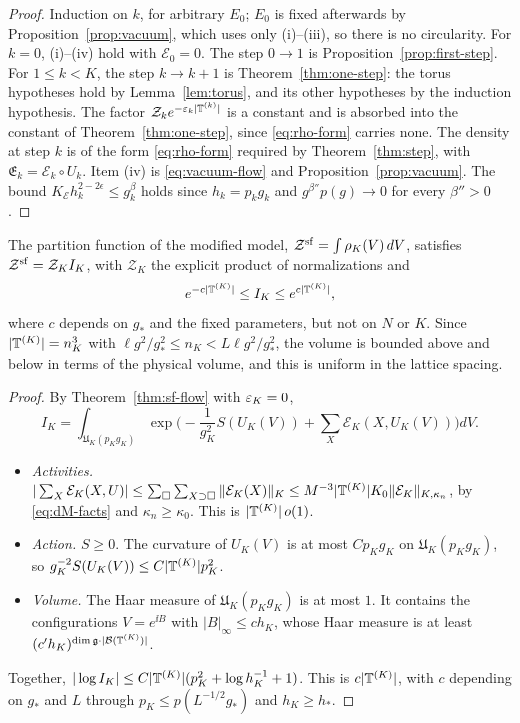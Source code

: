 \begin{proof}
Induction on $k$, for arbitrary $E_0$; $E_0$ is fixed afterwards by Proposition~\ref{prop:vacuum}, which uses only (i)--(iii), so there is no circularity. For $k=0$, (i)--(iv) hold with $\mathcal E_0=0$. The step $0\to1$ is Proposition~\ref{prop:first-step}. For $1\le k<K$, the step $k\to k+1$ is Theorem~\ref{thm:one-step}: the torus hypotheses hold by Lemma~\ref{lem:torus}, and its other hypotheses by the induction hypothesis. The factor $\mathcal Z_ke^{-\varepsilon_k|\mathbb T^{(k)}|}$ is a constant and is absorbed into the constant of Theorem~\ref{thm:one-step}, since \eqref{eq:rho-form} carries none. The density at step $k$ is of the form \eqref{eq:rho-form} required by Theorem~\ref{thm:step}, with $\mathfrak E_k=\mathcal E_k\circ U_k$. Item (iv) is \eqref{eq:vacuum-flow} and Proposition~\ref{prop:vacuum}. The bound $K_{\mathcal E}h_k^{2-2\epsilon}\le g_k^\beta$ holds since $h_k=p_kg_k$ and $g^{\beta''}p(g)\to0$ for every $\beta''>0$.
\end{proof}

\begin{corollary}\label{cor:sf-stability}
The partition function of the modified model, $\mathcal Z^{\rm sf}=\int\rho_K(V)\,dV$, satisfies $\mathcal Z^{\rm sf}=\mathcal Z_KI_K$, with $\mathcal Z_K$ the explicit product of normalizations and
\[
e^{-c|\mathbb T^{(K)}|}\le I_K\le e^{c|\mathbb T^{(K)}|},
\]
where $c$ depends on $g_*$ and the fixed parameters, but not on $N$ or $K$. Since $|\mathbb T^{(K)}|=n_K^3$ with $\ell g^2/g_*^2\le n_K<L\ell g^2/g_*^2$, the volume is bounded above and below in terms of the physical volume, and this is uniform in the lattice spacing.
\end{corollary}

\begin{proof}
By Theorem~\ref{thm:sf-flow} with $\varepsilon_K=0$,
\[
I_K=\int_{\mathfrak U_K(p_Kg_K)}\exp\Big(-\frac1{g_K^2}S(U_K(V))+\sum_X\mathcal E_K(X,U_K(V))\Big)dV .
\]
\begin{itemize}
\item \emph{Activities.} $|\sum_X\mathcal E_K(X,U)|\le\sum_\Box\sum_{X\supset\Box}\|\mathcal E_K(X)\|_K\le M^{-3}|\mathbb T^{(K)}|K_0\|\mathcal E_K\|_{K,\kappa_n}$, by \eqref{eq:dM-facts} and $\kappa_n\ge\kappa_0$. This is $|\mathbb T^{(K)}|\,o(1)$.
\item \emph{Action.} $S\ge0$. The curvature of $U_K(V)$ is at most $Cp_Kg_K$ on $\mathfrak U_K(p_Kg_K)$, so $g_K^{-2}S(U_K(V))\le C|\mathbb T^{(K)}|p_K^2$.
\item \emph{Volume.} The Haar measure of $\mathfrak U_K(p_Kg_K)$ is at most $1$. It contains the configurations $V=e^{\ii B}$ with $|B|_\infty\le ch_K$, whose Haar measure is at least $(c'h_K)^{\dim\mathfrak g\cdot|\mathcal B(\mathbb T^{(K)})|}$.
\end{itemize}
Together, $|\log I_K|\le C|\mathbb T^{(K)}|(p_K^2+\log h_K^{-1}+1)$. This is $c|\mathbb T^{(K)}|$, with $c$ depending on $g_*$ and $L$ through $p_K\le p(L^{-1/2}g_*)$ and $h_K\ge h_*$.
\end{proof}


